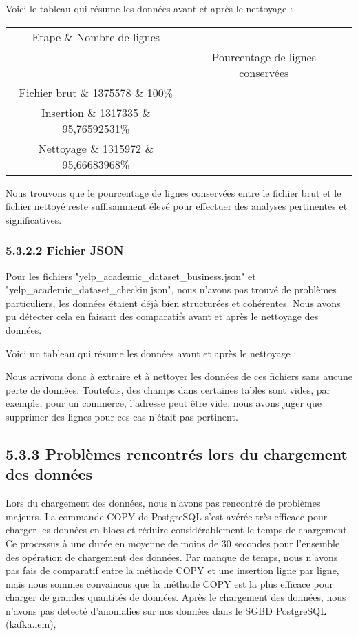 \begin{itemize}
\begin{itemize}
\begin{itemize}
Voici le tableau qui résume les données avant et après le nettoyage :

\begin{center}
\begin{tabular}{|c|c|c|}
\hline
Etape \& Nombre de lignes \\& Pourcentage de lignes conservées \\
\hline
Fichier brut \& 1375578 \& 100\% \\
\hline
Insertion \& 1317335 \& 95,76592531\% \\
\hline
Nettoyage \& 1315972 \& 95,66683968\% \\
\hline
\end{tabular}
\end{center}

Nous trouvons que le pourcentage de lignes conservées entre le fichier brut et le fichier nettoyé reste suffisamment élevé pour effectuer des analyses pertinentes et significatives.


\subsubsection{5.3.2.2 Fichier JSON}

Pour les fichiers "yelp_academic_dataset_business.json" et "yelp_academic_dataset_checkin.json", nous n'avons pas trouvé de problèmes particuliers, les données étaient déjà bien structurées et cohérentes.
Nous avons pu détecter cela en faisant des comparatifs avant et après le nettoyage des données.

Voici un tableau qui résume les données avant et après le nettoyage :

Nous arrivons donc à extraire et à nettoyer les données de ces fichiers sans aucune perte de données. Toutefois, des champs dans certaines tables sont vides, par exemple, pour un commerce,
l'adresse peut être vide, nous avons juger que supprimer des lignes pour ces cas n'était pas pertinent.

\textbf{
}

\subsection{5.3.3 Problèmes rencontrés lors du chargement des données}

Lors du chargement des données, nous n'avons pas rencontré de problèmes majeurs.
La commande COPY de PostgreSQL s'est avérée très efficace pour charger les données en blocs et réduire considérablement le temps de chargement.
Ce processus à une durée en moyenne de moins de 30 secondes pour l'ensemble des opération de chargement des données.
Par manque de temps, nous n'avons pas fais de comparatif entre la méthode COPY et une insertion ligne par ligne, mais nous sommes convaincus que la méthode COPY est la plus efficace pour charger de grandes quantités de données.
Après le chargement des données, nous n'avons pas detecté d'anomalies sur nos données dans le SGBD PostgreSQL (kafka.iem),



\end{itemize}
\end{itemize}
\end{itemize}

